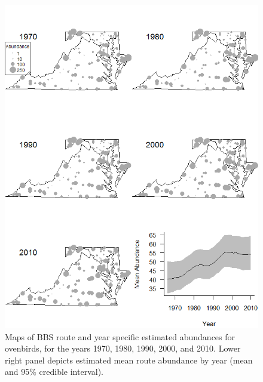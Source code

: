 \documentclass[12pt]{article}
\begin{document}
\begin{figure}
  \centering
  \includegraphics[width=6.6in]{figs/OVEN_N_by_route_year4}
\caption{Maps of BBS route and year specific estimated abundances for ovenbirds, for the years 1970,
1980, 1990, 2000, and 2010.  Lower right panel depicts estimated mean route abundance by year
(mean and 95\% credible interval).}
\label{fig:oven_N}
\end{figure}
\end{document}
